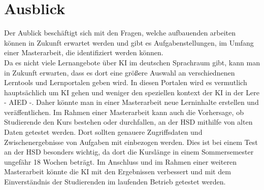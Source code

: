 \chapter{Ausblick} 
Der Aublick beschäftigt sich mit den Fragen, welche aufbauenden arbeiten können in Zukunft erwartet werden und gibt es Aufgabenstellungen, im Umfang einer Masterarbeit, die identifiziert werden können.
\\ \noindent
Da es nicht viele Lernangebote über KI im deutschen Sprachraum gibt, kann man in Zukunft erwarten, dass es dort eine größere Auswahl an verschiednenen Lerntools und Lernportalen geben wird.
In diesen Portalen wird es vermutlich hauptsächlich um KI gehen und weniger den speziellen kontext der KI in der Lere - AIED -. Daher könnte man in einer Masterarbeit neue Lerninhalte erstellen und veräffentlichen.
Im Rahmen einer Masterarbeit kann auch die Vorhersage, ob Studierende den Kurs bestehen oder durchfallen, an der HSD mithilfe von alten Daten getestet werden.
Dort sollten genauere Zugriffsdaten und Zwischenergebnisse von Aufgaben mit einbezogen werden. Dies ist bei einem Test an der HSD besonders wichtig, da dort die Kurslänge in einem Sommersemester ungefähr 18 Wochen beträgt.
Im Anschluss und im Rahmen einer weiteren Masterarbeit könnte die KI mit den Ergebnissen verbessert und mit dem Einverständnis der Studierenden im laufenden Betrieb getestet werden.
